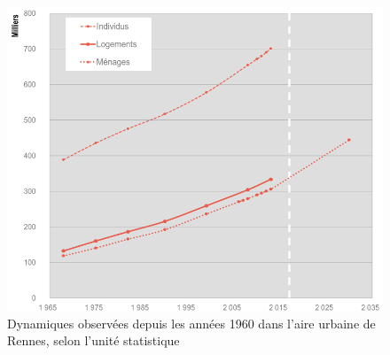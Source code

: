 \documentclass{bredele}
\begin{document}
\begin{figure}
\centering
\includegraphics[width=\textwidth]{dynamiques.png}
\caption{Dynamiques observées depuis les années 1960 dans l'aire urbaine de Rennes, selon l'unité statistique}
\begin{flushright}
\end{flushright}
\label{Dynamiques passées}
\end{figure}
\end{document}

